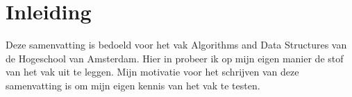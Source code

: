 \section*{Inleiding}
Deze samenvatting is bedoeld voor het vak Algorithms and Data Structures van de Hogeschool van Amsterdam.
Hier in probeer ik op mijn eigen manier de stof van het vak uit te leggen.
Mijn motivatie voor het schrijven van deze samenvatting is om mijn eigen kennis van het vak te testen.

